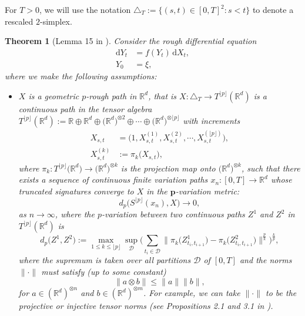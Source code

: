 \documentclass{article}
\def\floor#1{\lfloor #1 \rfloor}
\newcommand{\R}{\mathbb{R}}
\newcommand{\D}{\mathcal{D}}
\newtheorem{theorem}{Theorem}[section]
\newcommand{\dby}{\mathrm{d}}
\begin{document}
For $T > 0$, we will use the notation $\triangle_T := \{(s,t)\in [0,T]^2: s < t\}$ to denote a rescaled $2$-simplex.

\begin{theorem}[Lemma 15 in \citet{logode2014estimate}]\label{thm:logODEthm}
Consider the rough differential equation
\begin{align}
\dby Y_t & = f(Y_t)\,\dby X_t,\label{eq:RDE}\\
Y_0 & = \xi,\nonumber
\end{align}
where we make the following assumptions:
\begin{itemize}
\item $X$ is a \emph{geometric $p$-rough path} in $\R^d$, that is $X : \triangle_T \rightarrow T^{\floor{p}}(\R^d)$ is a continuous path in the tensor algebra
$T^{\floor{p}}(\R^d) := \R \oplus \R^d \oplus \big(\R^d\big)^{\otimes 2} \oplus \cdots \oplus \big(\R^d\big)^{\otimes \floor{p}}$ with increments
\begin{align}
X_{s,t} & = \Big(1, X_{s,t}^{(1)}, X_{s,t}^{(2)}, \cdots, X_{s,t}^{(\floor{p})}\Big),\label{eq:roughpathincrements}\\
X_{s,t}^{(k)} & := \pi_k\big(X_{s,t}\big),\nonumber
\end{align}
where $\pi_k : T^{\floor{p}}\big(\R^d\big)\rightarrow \big(\R^d\big)^{\otimes k}$ is the projection map onto $\big(\R^d\big)^{\otimes k}$, such that there exists a sequence of
continuous finite variation paths $x_n : [0,T] \rightarrow \R^d$ whose truncated signatures converge to $X$ in the \emph{$\boldsymbol{p}$-variation metric}:
\begin{equation}
d_p\Big(S^{\floor{p}}(x_n), X\Big) \rightarrow 0,
\label{eq:rpconvege}
\end{equation}
as $n\rightarrow\infty$, where the $p$-variation between two continuous paths $Z^1$ and $Z^2$ in $T^{\floor{p}}(\R^d)$ is
\begin{equation}
d_p\big(Z^1, Z^2\big) := \max_{1\leq k\leq \floor{p}}\sup_{\D}\bigg(\sum_{t_i\in\D}\Big\|\pi_k\big(Z_{t_i, t_{i+1}}^1\big) - \pi_k\big(Z_{t_i, t_{i+1}}^2\big)\Big\|^\frac{p}{k}\bigg)^\frac{k}{p},
\label{eq:rpmetric}
\end{equation}
where the supremum is taken over all partitions $\D$ of $[0,T]$ and the norms $\|\cdot\|$ must satisfy (up to some constant)
\begin{equation}
\|a\otimes b\| \leq \|a\|\|b\|,\nonumber
\end{equation}
for $a\in(\R^d)^{\otimes n}$ and $b\in(\R^d)^{\otimes m}$. For example, we can take $\|\cdot\|$ to be the projective or injective tensor norms (see Propositions 2.1 and 3.1 in \citet{tensorproducts2002book}).


\end{itemize}
\end{theorem}
\end{document}
